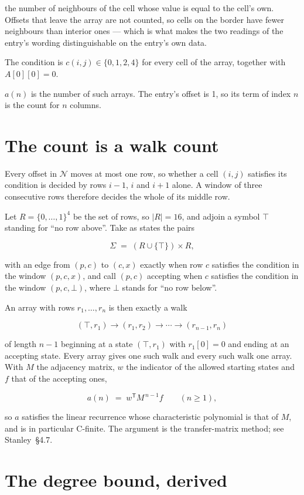 \documentclass[11pt]{article}
\theoremstyle{definition}
\begin{document}
the number of neighbours of the cell whose value is equal to the cell's own. Offsets that leave the array are not counted, so cells on the border have fewer neighbours than interior ones --- which is what makes the two readings of the entry's wording distinguishable on the entry's own data.

The condition is $c(i,j) \in \{0, 1, 2, 4\}$ for every cell of the array, together with $A[0][0]=0$.

$a(n)$ is the number of such arrays. The entry's offset is 1, so its term of index $n$ is the count for $n$ columns.

\section{The count is a walk count}

Every offset in $\mathcal{N}$ moves at most one row, so whether a cell $(i,j)$ satisfies its condition is decided by rows $i-1$, $i$ and $i+1$ alone. A window of three consecutive rows therefore decides the whole of its middle row.

Let $R = \{0,\dots,1\}^{4}$ be the set of rows, so $|R| = 16$, and adjoin a symbol $\top$ standing for ``no row above''. Take as states the pairs

\[\Sigma \;=\; (R \cup \{\top\}) \times R,\]

with an edge from $(p,c)$ to $(c,x)$ exactly when row $c$ satisfies the condition in the window $(p,c,x)$, and call $(p,c)$ accepting when $c$ satisfies the condition in the window $(p,c,\bot)$, where $\bot$ stands for ``no row below''.

An array with rows $r_1,\dots,r_n$ is then exactly a walk

\[(\top,r_1) \to (r_1,r_2) \to \cdots \to (r_{n-1},r_n)\]

of length $n-1$ beginning at a state $(\top,r_1)$ with $r_1[0]=0$ and ending at an accepting state. Every array gives one such walk and every such walk one array. With $M$ the adjacency matrix, $w$ the indicator of the allowed starting states and $f$ that of the accepting ones,

\[a(n) \;=\; w^{\mathsf T} M^{\,n-1} f \qquad (n \ge 1),\]

so $a$ satisfies the linear recurrence whose characteristic polynomial is that of $M$, and is in particular C-finite. The argument is the transfer-matrix method; see Stanley~\S4.7.

\section{The degree bound, derived}
\end{document}
